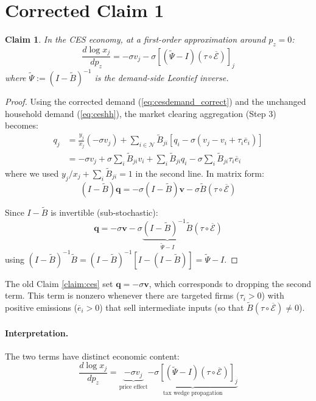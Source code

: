 \documentclass[11pt]{article}
\newtheorem{claim}{Claim}
\newcommand{\N}{\mathcal{N}}
\begin{document}
\section{Corrected Claim 1}

\begin{claim}
\label{claim:ces_correct}
In the CES economy, at a first-order approximation around $p_z = 0$:
$$\frac{d\log x_j}{dp_z} = -\sigma v_j - \sigma\left[(\widetilde{\Psi} - I)(\tau \circ \overline{\mathcal{E}})\right]_j$$
where $\widetilde{\Psi} := (I - \widetilde{B})^{-1}$ is the demand-side Leontief inverse.
\end{claim}

\begin{proof}
Using the corrected demand (\ref{eq:cesdemand_correct}) and the unchanged household demand (\ref{eq:ceshh}), the market clearing aggregation (Step 3) becomes:
\begin{align*}
    q_j &= \frac{y_j}{x_j}(-\sigma v_j) + \sum_{i \in \N}\widetilde{B}_{ji}\left[q_i - \sigma(v_j - v_i + \tau_i\overline{e}_i)\right] \\
    &= -\sigma v_j + \sigma\sum_i \widetilde{B}_{ji} v_i + \sum_i \widetilde{B}_{ji} q_i - \sigma\sum_i \widetilde{B}_{ji}\tau_i\overline{e}_i
\end{align*}
where we used $y_j/x_j + \sum_i \widetilde{B}_{ji} = 1$ in the second line. In matrix form:
$$(I - \widetilde{B})\mathbf{q} = -\sigma(I - \widetilde{B})\mathbf{v} - \sigma\widetilde{B}(\tau \circ \overline{\mathcal{E}})$$

Since $I - \widetilde{B}$ is invertible (sub-stochastic):
\begin{equation}
    \label{eq:q_correct}
    \mathbf{q} = -\sigma\mathbf{v} - \sigma\underbrace{(I - \widetilde{B})^{-1}\widetilde{B}}_{\widetilde{\Psi} - I}(\tau \circ \overline{\mathcal{E}})
\end{equation}
using $(I-\widetilde{B})^{-1}\widetilde{B} = (I-\widetilde{B})^{-1}[I - (I-\widetilde{B})] = \widetilde{\Psi} - I$.
\end{proof}

The old Claim \ref{claim:ces} set $\mathbf{q} = -\sigma\mathbf{v}$, which corresponds to dropping the second term. This term is nonzero whenever there are targeted firms ($\tau_i > 0$) with positive emissions ($\overline{e}_i > 0$) that sell intermediate inputs (so that $\widetilde{B}(\tau \circ \overline{\mathcal{E}}) \neq 0$).

\paragraph{Interpretation.} The two terms have distinct economic content:
$$\frac{d\log x_j}{dp_z} = \underbrace{-\sigma v_j}_{\text{price effect}} \underbrace{- \sigma\left[(\widetilde{\Psi} - I)(\tau \circ \overline{\mathcal{E}})\right]_j}_{\text{tax wedge propagation}}$$
\end{document}
